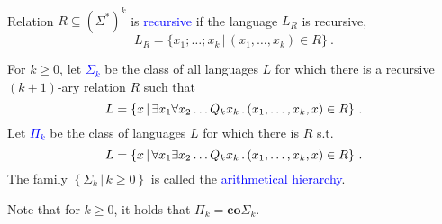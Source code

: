 \documentclass{beamer}
\newcommand{\st}{\,|\,}
\newcommand{\hlbl}[1]{\textcolor{blue}{#1}}
\begin{document}
\begin{frame}
  \frametitle{\insertsubsection}
  \begin{definition}
    Relation $R \subseteq \left(\Sigma^{*}\right)^k$ is \hlbl{recursive} if the
    language $L_R$ is recursive,
    \vspace{-2mm}
    \begin{equation*}
    L_R = \{x_1; \dots ; x_k \st (x_1, \dots, x_k) \in R\}~.
    \end{equation*}
  \end{definition}

  \pause
  \begin{definition}
    For $k \geq 0$, let \hlbl{$\Sigma_k$} be the class of all languages $L$ for
    which there is a recursive $(k+1)$-ary relation $R$ such that
    \vspace{-2mm}
    \begin{equation*}
      L = \{x \st \exists x_1 \forall x_2 \dots Q_k x_k\,.\,(x_1, \dots, x_k, x)
      \in R\}~.
    \vspace{-2mm}
    \end{equation*}
    Let \hlbl{$\Pi_k$} be the class of languages $L$ for which there is $R$ s.t.
    \vspace{-2mm}
    \begin{equation*}
      L = \{x \st \forall x_1 \exists x_2 \dots Q_k x_k\,.\,(x_1, \dots, x_k, x)
      \in R\}~.
    \vspace{-2mm}
    \end{equation*}
    The family $\left\{\Sigma_k\st k\geq 0\right\}$ is called the
    \hlbl{arithmetical hierarchy}.
  \end{definition}
  \pause
  Note that for $k \geq 0$, it holds that $\Pi_k = \mathsf{\mathbf{co}}\Sigma_k$.
\end{frame}
\end{document}
